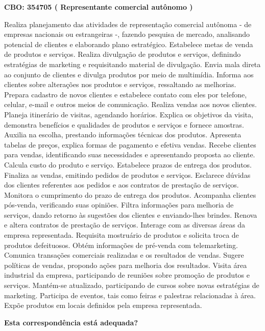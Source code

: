 \documentclass[
]{article}
\begin{document}
\textbf{CBO: 354705  ( Representante comercial autônomo )}

Realiza planejamento das atividades de representação comercial autônoma
- de empresas nacionais ou estrangeiras -, fazendo pesquisa de mercado,
analisando potencial de clientes e elaborando plano estratégico.
Estabelece metas de venda de produtos e serviços. Realiza divulgação de
produtos e serviços, definindo estratégias de marketing e requisitando
material de divulgação. Envia mala direta ao conjunto de clientes e
divulga produtos por meio de multimídia. Informa aos clientes sobre
alterações nos produtos e serviços, ressaltando as melhorias. Prepara
cadastro de novos clientes e estabelece contato com eles por telefone,
celular, e-mail e outros meios de comunicação. Realiza vendas aos novos
clientes. Planeja itinerário de visitas, agendando horários. Explica os
objetivos da visita, demonstra benefícios e qualidades de produtos e
serviços e fornece amostras. Auxilia na escolha, prestando informações
técnicas dos produtos. Apresenta tabelas de preços, explica formas de
pagamento e efetiva vendas. Recebe clientes para vendas, identificando
suas necessidades e apresentando proposta ao cliente. Calcula custo do
produto e serviço. Estabelece prazos de entrega dos produtos. Finaliza
as vendas, emitindo pedidos de produtos e serviços. Esclarece dúvidas
dos clientes referentes aos pedidos e aos contratos de prestação de
serviços. Monitora o cumprimento do prazo de entrega dos produtos.
Acompanha clientes pós-venda, verificando suas opiniões. Filtra
informações para melhoria de serviços, dando retorno às sugestões dos
clientes e enviando-lhes brindes. Renova e altera contratos de prestação
de serviços. Interage com as diversas áreas da empresa representada.
Requisita mostruário de produtos e solicita troca de produtos
defeituosos. Obtém informações de pré-venda com telemarketing. Comunica
transações comerciais realizadas e os resultados de vendas. Sugere
políticas de vendas, propondo ações para melhoria dos resultados. Visita
área industrial da empresa, participando de reuniões sobre promoção de
produtos e serviços. Mantém-se atualizado, participando de cursos sobre
novas estratégias de marketing. Participa de eventos, tais como feiras e
palestras relacionadas à área. Expõe produtos em locais definidos pela
empresa representada.

\begin{Form}
\textbf{Esta correspondência está adequada?} \\ 
\end{Form}
\end{document}
